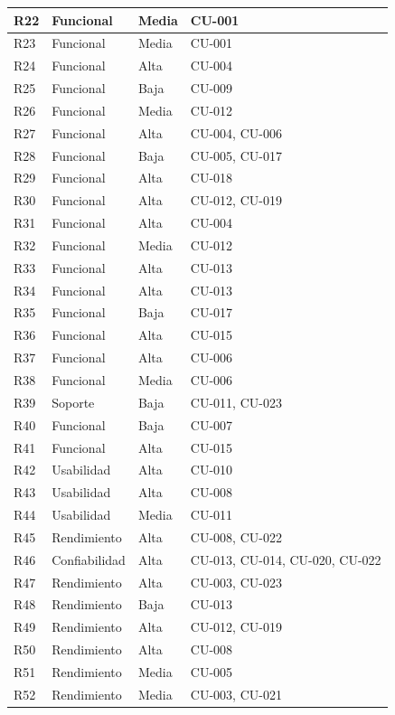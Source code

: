 \documentclass[11pt,a4paper]{article}
\DeclareRobustCommand{\_}{\textunderscore\allowbreak}
\begin{document}
\begin{center}
\begin{longtable}{|>{\raggedright\arraybackslash}p{}|>{\raggedright\arraybackslash}p{}|>{\raggedright\arraybackslash}p{}|>{\raggedright\arraybackslash}p{}|}
\hline
R22 & Funcional & Media & CU-001 \\
\hline
R23 & Funcional & Media & CU-001 \\
\hline
R24 & Funcional & Alta & CU-004 \\
\hline
R25 & Funcional & Baja & CU-009 \\
\hline
R26 & Funcional & Media & CU-012 \\
\hline
R27 & Funcional & Alta & CU-004, CU-006 \\
\hline
R28 & Funcional & Baja & CU-005, CU-017 \\
\hline
R29 & Funcional & Alta & CU-018 \\
\hline
R30 & Funcional & Alta & CU-012, CU-019 \\
\hline
R31 & Funcional & Alta & CU-004 \\
\hline
R32 & Funcional & Media & CU-012 \\
\hline
R33 & Funcional & Alta & CU-013 \\
\hline
R34 & Funcional & Alta & CU-013 \\
\hline
R35 & Funcional & Baja & CU-017 \\
\hline
R36 & Funcional & Alta & CU-015 \\
\hline
R37 & Funcional & Alta & CU-006 \\
\hline
R38 & Funcional & Media & CU-006 \\
\hline
R39 & Soporte & Baja & CU-011, CU-023 \\
\hline
R40 & Funcional & Baja & CU-007 \\
\hline
R41 & Funcional & Alta & CU-015 \\
\hline
R42 & Usabilidad & Alta & CU-010 \\
\hline
R43 & Usabilidad & Alta & CU-008 \\
\hline
R44 & Usabilidad & Media & CU-011 \\
\hline
R45 & Rendimiento & Alta & CU-008, CU-022 \\
\hline
R46 & Confiabilidad & Alta & CU-013, CU-014, CU-020, CU-022 \\
\hline
R47 & Rendimiento & Alta & CU-003, CU-023 \\
\hline
R48 & Rendimiento & Baja & CU-013 \\
\hline
R49 & Rendimiento & Alta & CU-012, CU-019 \\
\hline
R50 & Rendimiento & Alta & CU-008 \\
\hline
R51 & Rendimiento & Media & CU-005 \\
\hline
R52 & Rendimiento & Media & CU-003, CU-021 \\

\end{longtable}
\end{center}
\end{document}
